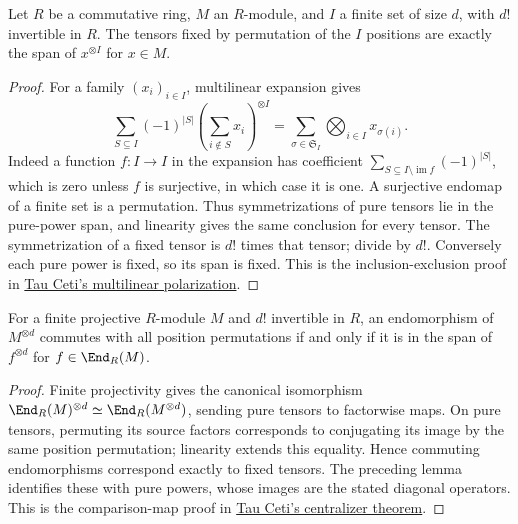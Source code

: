 \begin{lemma}
\label{lem:symmetric-tensor-pure-power-span}
\leanok
Let $R$ be a commutative ring, $M$ an $R$-module, and $I$ a finite set of
size $d$, with $d!$ invertible in $R$. The tensors fixed by permutation of
the $I$ positions are exactly the span of $x^{\otimes I}$ for $x\in M$.
\end{lemma}
\begin{proof}
For a family $(x_i)_{i\in I}$, multilinear expansion gives
\[
 \sum_{S\subseteq I}(-1)^{|S|}
       \left(\sum_{i\notin S}x_i\right)^{\otimes I}
 =\sum_{\sigma\in\mathfrak S_I}\bigotimes_{i\in I}x_{\sigma(i)}.
\]
Indeed a function $f:I\to I$ in the expansion has coefficient
$\sum_{S\subseteq I\setminus\operatorname{im}f}(-1)^{|S|}$, which is
zero unless $f$ is surjective, in which case it is one. A surjective
endomap of a finite set is a permutation. Thus symmetrizations of pure
tensors lie in the pure-power span, and linearity gives the same conclusion
for every tensor. The symmetrization of a fixed tensor is $d!$ times that
tensor; divide by $d!$. Conversely each pure power is fixed, so its span is
fixed. This is the inclusion-exclusion proof in
\href{https://github.com/TauCetiProject/TauCeti/blob/b3b0334ab9203d9faee4b2f34cd75161463ecdd0/TauCeti/LinearAlgebra/Multilinear/Polarization.lean}{Tau Ceti's multilinear polarization}.
\end{proof}

\begin{lemma}
\label{lem:permutation-tensor-commutant}
\leanok
For a finite projective $R$-module $M$ and $d!$ invertible in $R$, an
endomorphism of $M^{\otimes d}$ commutes with all position permutations
if and only if it is in the span of $f^{\otimes d}$ for $f\in\End_R(M)$.
\end{lemma}
\begin{proof}
Finite projectivity gives the canonical isomorphism
$\End_R(M)^{\otimes d}\simeq\End_R(M^{\otimes d})$, sending pure
tensors to factorwise maps. On pure tensors, permuting its source factors
corresponds to conjugating its image by the same position permutation;
linearity extends this equality. Hence commuting endomorphisms correspond
exactly to fixed tensors. The preceding lemma identifies these with pure
powers, whose images are the stated diagonal operators. This is the
comparison-map proof in
\href{https://github.com/TauCetiProject/TauCeti/blob/b3b0334ab9203d9faee4b2f34cd75161463ecdd0/TauCeti/RepresentationTheory/Symmetric/TensorAction/Centralizer.lean}{Tau Ceti's centralizer theorem}.
\end{proof}

